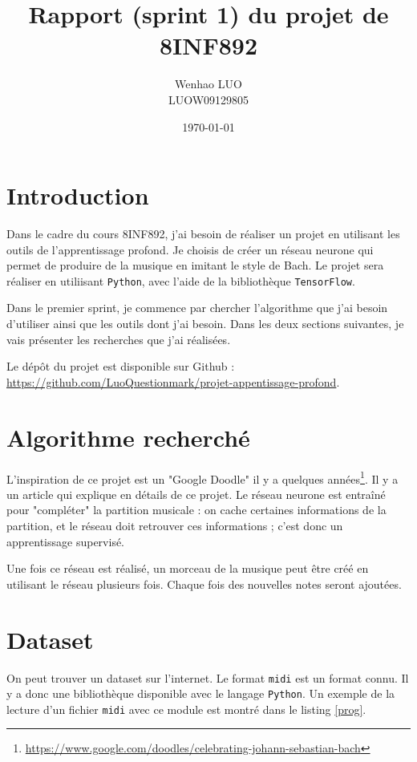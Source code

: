 \documentclass{article}
\title{Rapport (sprint 1) du projet de 8INF892}
\author{Wenhao LUO\\LUOW09129805}
\date{\today}
\begin{document}
\maketitle

\newpage
\section{Introduction}

\par Dans le cadre du cours 8INF892, j'ai besoin de réaliser un projet en utilisant les outils de l'apprentissage profond. Je choisis de créer un réseau neurone qui permet de produire de la musique en imitant le style de Bach. Le projet sera réaliser en utiliisant \texttt{Python}, avec l'aide de la bibliothèque \texttt{TensorFlow}.

\par Dans le premier sprint, je commence par chercher l'algorithme que j'ai besoin d'utiliser ainsi que les outils dont j'ai besoin. Dans les deux sections suivantes, je vais présenter les recherches que j'ai réalisées.

\par Le dépôt du projet est disponible sur Github : \url{https://github.com/LuoQuestionmark/projet-appentissage-profond}.

\section{Algorithme recherché}

\par L'inspiration de ce projet est un "Google Doodle" il y a quelques années\footnote{\url{https://www.google.com/doodles/celebrating-johann-sebastian-bach}}. Il y a un article qui explique en détails de ce projet\cite{huang2017counterpoint}. Le réseau neurone est entraîné pour "compléter" la partition musicale : on cache certaines informations de la partition, et le réseau doit retrouver ces informations ; c'est donc un apprentissage supervisé.

\par Une fois ce réseau est réalisé, un morceau de la musique peut être créé en utilisant le réseau plusieurs fois. Chaque fois des nouvelles notes seront ajoutées.

\section{Dataset}

\par On peut trouver un dataset sur l'internet\cite{bachmid}. Le format \texttt{midi} est un format connu. Il y a donc une bibliothèque disponible avec le langage \texttt{Python}\cite{python-mid}. Un exemple de la lecture d'un fichier \texttt{midi} avec ce module est montré dans le listing \ref{prog}.
\end{document}
